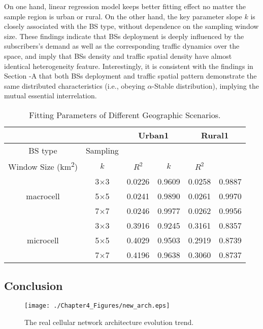 On one hand, linear regression model keeps better fitting effect no matter the sample region is urban or rural. On the other hand, the key parameter slope ${k}$ is closely associated with the BS type, without dependence on the sampling window size. These findings indicate that BSs deployment is deeply influenced by the subscribers's demand as well as the corresponding traffic dynamics over the space, and imply that BSs density and traffic spatial density have almost identical heterogeneity feature. Interestingly, it is consistent with the findings in Section \uppercase\expandafter{}-{A} that both BSs deployment and traffic spatial pattern demonstrate the same distributed characteristics (i.e., obeying $\alpha$-Stable distribution), implying the mutual essential interrelation.
\begin{table}
\centering
\normalsize
\caption{Fitting Parameters of Different Geographic Scenarios.}
\small
\begin{tabular}{cccccc}
\toprule
\multicolumn{2}{c}{} & \multicolumn{2}{c}{Urban1} & \multicolumn{2}{c}{Rural1}\\
\midrule
BS type & Sampling\\ Window Size (km\textsuperscript{2}) & ${k}$ & ${R^2}$ & ${k}$ & ${R^2}$\\		
\midrule
\multirow {3}{*}{macrocell} & 3${\times}$3  & 0.0226 & 0.9609 & 0.0258 & 0.9887\\
& 5${\times}$5 & 0.0241 & 0.9890 & 0.0261 & 0.9970\\
& 7${\times}$7 & 0.0246 & 0.9977 & 0.0262 & 0.9956\\
\midrule
\multirow {3}{*}{microcell} & 3${\times}$3  & 0.3916 & 0.9245 & 0.3161 & 0.8357\\
& 5${\times}$5 & 0.4029 & 0.9503 & 0.2919 & 0.8739\\
& 7${\times}$7 & 0.4196 & 0.9638 & 0.3060 & 0.8737\\
\bottomrule
\end{tabular}
\end{table}

\subsection{Conclusion}

\begin{figure}
	\centering
	\texttt{[image: ./Chapter4\_Figures/new\_arch.eps]}
	\setlength\abovecaptionskip{0pt}
	\setlength\belowcaptionskip{-5pt}
	\caption{The real cellular network architecture evolution trend.}
	\label{fig:7}
\end{figure}

